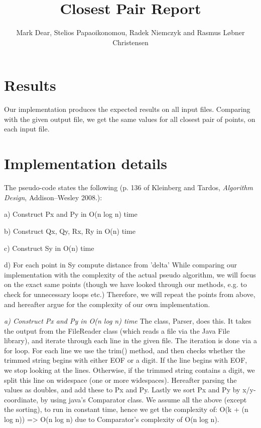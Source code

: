 \documentclass{tufte-handout}
\title{Closest Pair Report}
\author{Mark Dear, Stelios Papaoikonomou, Radek Niemczyk and Rasmus Løbner Christensen}
\begin{document}
  \maketitle

  \section{Results}

  Our implementation produces the expected results on all input files. Comparing with the given output file, we get the same values for all closest pair of points, on each input file.

  \section{Implementation details}

  The pseudo-code states the following (p. 136 of Kleinberg and Tardos, \emph{Algorithm Design}, Addison--Wesley 2008.):

a) 
Construct Px and Py in O(n log n) time

b) 
Construct Qx, Qy, Rx, Ry in O(n) time 

c)
Construct Sy in O(n) time

d)
For each point in Sy compute distance from 'delta' \newline
\bigskip
While comparing our implementation with the complexity of the actual pseudo algorithm, we will focus on the exact same points 
(though we have looked through our methods, e.g. to check for unnecessary loops etc.) \linebreak
Therefore, we will repeat the points from above, and hereafter argue for the complexity of our own implementation.

\bigskip
\emph{a) Construct Px and Py in O(n log n) time} \linebreak
The class, Parser, does this. It takes the output from the FileReader class (which reads a file via the Java File library), and iterate through each
line in the given file. The iteration is done via a for loop. For each line we use the trim() method, and then checks whether the trimmed string
begins with either EOF or a digit. If the line begins with EOF, we stop looking at the lines. Otherwise, if the trimmed string contains a digit,
we split this line on widespace (one or more widespaces). Hereafter parsing the values as doubles, and add these to Px and Py.
Lastly we sort Px and Py by x/y-coordinate, by using java's Comparator class.
We assume all the above (except the sorting), to run in constant time, hence we get the complexity of: 
O(k + (n log n)) => O(n log n) due to Comparator's complexity of O(n log n). \newline
\pagebreak
\end{document}
